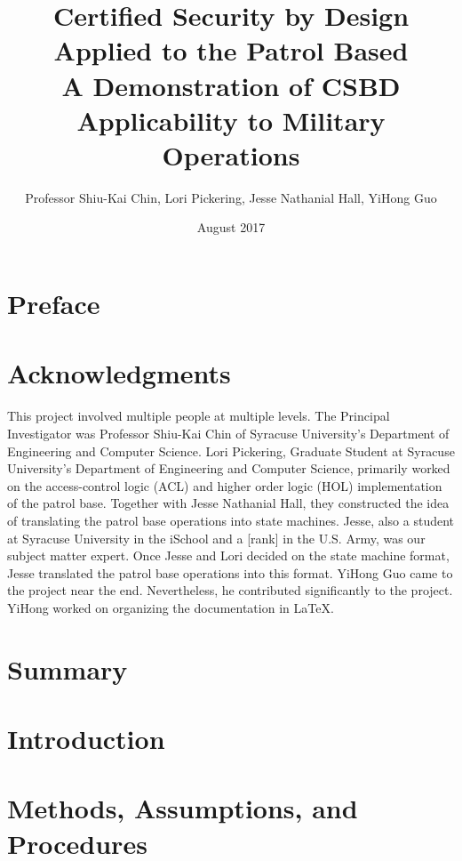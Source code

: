 \documentclass{book}
\title{Certified Security by Design Applied to the Patrol Based\\
  A Demonstration of CSBD Applicability to Military Operations}
\author{Professor Shiu-Kai Chin, Lori Pickering, Jesse Nathanial Hall, YiHong Guo}
\date{August 2017}
\begin{document}
\lstset{language=ML}
\maketitle{}

\tableofcontents{}

\listoffigures

\chapter*{Preface}
\label{cha:preface}


\chapter*{Acknowledgments}
\label{cha:acknowledgments}
  This project involved multiple people at multiple levels. The Principal Investigator was
  Professor Shiu-Kai Chin of Syracuse University’s Department of Engineering and Computer Science.
  Lori Pickering, Graduate Student at Syracuse University’s Department of Engineering and Computer
  Science, primarily worked on the access-control logic (ACL) and higher order logic (HOL)
  implementation of the patrol base. Together with Jesse Nathanial Hall, they constructed the
  idea of translating the patrol base operations into state machines. Jesse, also a student at
  Syracuse University in the iSchool and a [rank] in the U.S. Army, was our subject matter expert.
  Once Jesse and Lori decided on the state machine format, Jesse translated the patrol base operations
  into this format. YiHong Guo came to the project near the end. Nevertheless, he contributed significantly
  to the project. YiHong worked on organizing the documentation in LaTeX.


\chapter{Summary}
\label{cha:summary}


\chapter{Introduction}
\label{cha:introduction}


\chapter{Methods, Assumptions, and Procedures}
\label{cha:meth-assumpt-proc}

\end{document}
